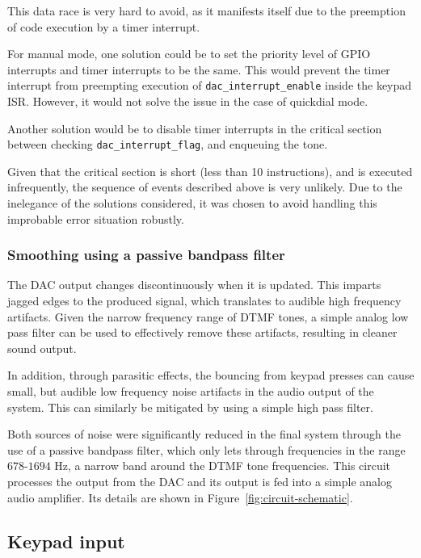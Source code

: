 \documentclass[11pt,a4paper,twocolumn]{scrartcl}
\begin{document}
This data race is very hard to avoid, as it manifests itself due to the preemption of code execution by a timer interrupt. 

For manual mode, one solution could be to set the priority level of GPIO interrupts and timer interrupts to be the same. This would prevent the timer interrupt from preempting execution of \verb!dac_interrupt_enable! inside the keypad ISR. However, it would not solve the issue in the case of quickdial mode.

Another solution would be to disable timer interrupts in the critical section between checking \verb!dac_interrupt_flag!, and enqueuing the tone.

Given that the critical section is short (less than 10 instructions), and is executed infrequently, the sequence of events described above is very unlikely. Due to the inelegance of the solutions considered, it was chosen to avoid handling this improbable error situation robustly.

\subsubsection{Smoothing using a passive bandpass filter}

The DAC output changes discontinuously when it is updated. This imparts jagged edges to the produced signal, which translates to audible high frequency artifacts. Given the narrow frequency range of DTMF tones, a simple analog low pass filter can be used to effectively remove these artifacts, resulting in cleaner sound output. 

In addition, through parasitic effects, the bouncing from keypad presses can cause small, but audible low frequency noise artifacts in the audio output of the system. This can similarly be mitigated by using a simple high pass filter.

Both sources of noise were significantly reduced in the final system through the use of a passive bandpass filter, which only lets through frequencies in the range $678$-$1694$ Hz, a narrow band around the DTMF tone frequencies. This circuit processes the output from the DAC and its output is fed into a simple analog audio amplifier. Its details are shown in Figure~\ref{fig:circuit-schematic}.

\subsection{Keypad input}~\label{keypad}
\end{document}
